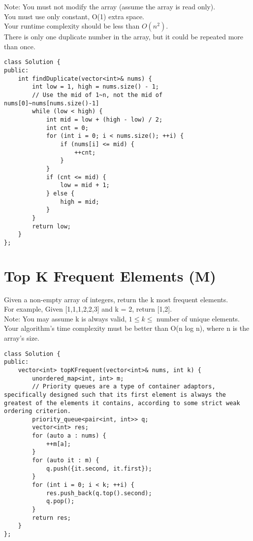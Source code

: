 Note:
    You must not modify the array (assume the array is read only).\\
    You must use only constant, O(1) extra space.\\
    Your runtime complexity should be less than $O(n^2)$.\\
    There is only one duplicate number in the array, but it could be repeated more than once.\\

\begin{lstlisting}
class Solution {
public:
    int findDuplicate(vector<int>& nums) {
        int low = 1, high = nums.size() - 1;
        // Use the mid of 1~n, not the mid of nums[0]~nums[nums.size()-1]
        while (low < high) {
            int mid = low + (high - low) / 2; 
            int cnt = 0;
            for (int i = 0; i < nums.size(); ++i) {
                if (nums[i] <= mid) {
                    ++cnt;
                }
            }
            if (cnt <= mid) {
                low = mid + 1;
            } else {
                high = mid;
            }
        }
        return low;
    }
};
\end{lstlisting}


\section{Top K Frequent Elements (M)}
Given a non-empty array of integers, return the k most frequent elements.\\

For example,
Given [1,1,1,2,2,3] and k = 2, return [1,2].\\

Note:
    You may assume k is always valid, $1 \leq k \leq $ number of unique elements.\\
    Your algorithm's time complexity must be better than O(n log n), where n is the array's size.\\

\begin{lstlisting}
class Solution {
public:
    vector<int> topKFrequent(vector<int>& nums, int k) {
        unordered_map<int, int> m;
        // Priority queues are a type of container adaptors, specifically designed such that its first element is always the greatest of the elements it contains, according to some strict weak ordering criterion.
        priority_queue<pair<int, int>> q;
        vector<int> res;
        for (auto a : nums) {
            ++m[a];
        }
        for (auto it : m) {
            q.push({it.second, it.first});
        }
        for (int i = 0; i < k; ++i) {
            res.push_back(q.top().second); 
            q.pop();
        }
        return res;
    }
};
\end{lstlisting}



